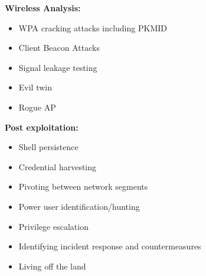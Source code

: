 \documentclass[a4paper,10pt]{article}
\begin{document}
\begin{multicols}{2}
\textbf{Wireless Analysis:}
\begin{itemize}[leftmargin=*]
    \item WPA cracking attacks including PKMID
    \item Client Beacon Attacks
    \item Signal leakage testing
    \item Evil twin
    \item Rogue AP
\end{itemize}

\textbf{Post exploitation:}
\begin{itemize}[leftmargin=*]
    \item Shell persistence
    \item Credential harvesting
    \item Pivoting between network segments
    \item Power user identification/hunting
    \item Privilege escalation
    \item Identifying incident response and countermeasures
    \item Living off the land
\end{itemize}

\end{multicols}

\newpage
\end{document}
